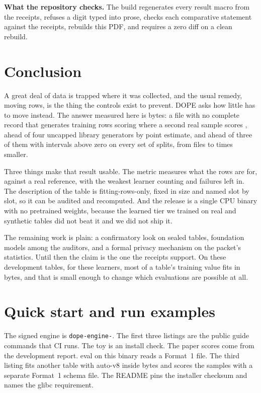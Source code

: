 \documentclass[10pt,letterpaper,twocolumn]{article}
\newcommand{\runin}[1]{\par\smallskip\noindent\textbf{#1.}\hspace{0.45em}\ignorespaces}
\newcommand{\cli}[1]{{\ttfamily\fontsize{8.9}{11}\selectfont #1}}
\begin{document}
\runin{What the repository checks} The build regenerates every result macro from the receipts, refuses a digit typed into prose, checks each comparative statement against the receipts, rebuilds this PDF, and requires a zero diff on a clean rebuild.
\section{Conclusion}\label{sec:conclusion}
A great deal of data is trapped where it was collected, and the usual remedy, moving rows, is the thing the controls exist to prevent. DOPE asks how little has to move instead. The answer measured here is  bytes: a file with no complete record that generates training rows scoring  where a second real sample scores , ahead of four uncapped library generators by point estimate, and ahead of three of them with intervals above zero on every set of splits, from files  to  times smaller.

Three things make that result usable. The metric measures what the rows are for, against a real reference, with the weakest learner counting and failures left in. The description of the table is fitting-rows-only, fixed in size and named slot by slot, so it can be audited and recomputed. And the release is a single CPU binary with no pretrained weights, because the learned tier we trained on real and synthetic tables did not beat it and we did not ship it.

The remaining work is plain: a confirmatory look on sealed tables, foundation models among the auditors, and a formal privacy mechanism on the packet's statistics. Until then the claim is the one the receipts support. On these development tables, for these learners, most of a table's training value fits in  bytes, and that is small enough to change which evaluations are possible at all.
\appendix
\onecolumn
\hypertarget{quick-start}{}
\section{Quick start and run examples}\label{app:quick-start}
The signed engine is \texttt{dope-engine-}. The first three listings are the public guide commands that CI runs. The toy is an install check. The paper scores come from the development report. \cli{eval} on this binary reads a Format~1 file. The third listing fits another table with \cli{auto-v8} inside  bytes and scores the samples with a separate Format~1 schema file. The README pins the installer checksum and names the glibc requirement.
\end{document}
